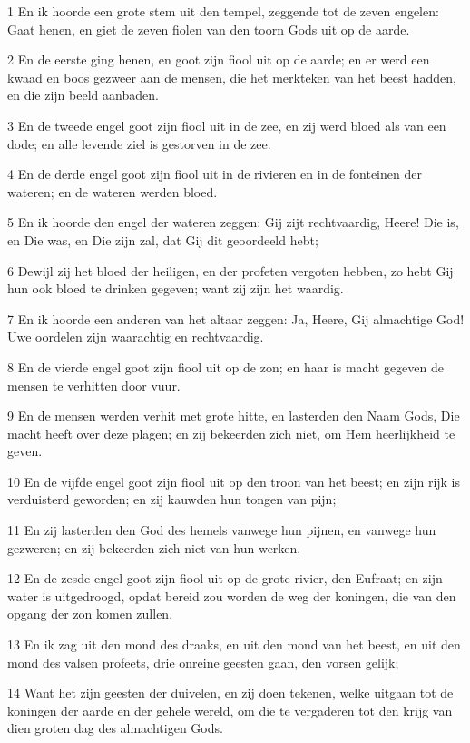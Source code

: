 \par 1 En ik hoorde een grote stem uit den tempel, zeggende tot de zeven engelen: Gaat henen, en giet de zeven fiolen van den toorn Gods uit op de aarde.
\par 2 En de eerste ging henen, en goot zijn fiool uit op de aarde; en er werd een kwaad en boos gezweer aan de mensen, die het merkteken van het beest hadden, en die zijn beeld aanbaden.
\par 3 En de tweede engel goot zijn fiool uit in de zee, en zij werd bloed als van een dode; en alle levende ziel is gestorven in de zee.
\par 4 En de derde engel goot zijn fiool uit in de rivieren en in de fonteinen der wateren; en de wateren werden bloed.
\par 5 En ik hoorde den engel der wateren zeggen: Gij zijt rechtvaardig, Heere! Die is, en Die was, en Die zijn zal, dat Gij dit geoordeeld hebt;
\par 6 Dewijl zij het bloed der heiligen, en der profeten vergoten hebben, zo hebt Gij hun ook bloed te drinken gegeven; want zij zijn het waardig.
\par 7 En ik hoorde een anderen van het altaar zeggen: Ja, Heere, Gij almachtige God! Uwe oordelen zijn waarachtig en rechtvaardig.
\par 8 En de vierde engel goot zijn fiool uit op de zon; en haar is macht gegeven de mensen te verhitten door vuur.
\par 9 En de mensen werden verhit met grote hitte, en lasterden den Naam Gods, Die macht heeft over deze plagen; en zij bekeerden zich niet, om Hem heerlijkheid te geven.
\par 10 En de vijfde engel goot zijn fiool uit op den troon van het beest; en zijn rijk is verduisterd geworden; en zij kauwden hun tongen van pijn;
\par 11 En zij lasterden den God des hemels vanwege hun pijnen, en vanwege hun gezweren; en zij bekeerden zich niet van hun werken.
\par 12 En de zesde engel goot zijn fiool uit op de grote rivier, den Eufraat; en zijn water is uitgedroogd, opdat bereid zou worden de weg der koningen, die van den opgang der zon komen zullen.
\par 13 En ik zag uit den mond des draaks, en uit den mond van het beest, en uit den mond des valsen profeets, drie onreine geesten gaan, den vorsen gelijk;
\par 14 Want het zijn geesten der duivelen, en zij doen tekenen, welke uitgaan tot de koningen der aarde en der gehele wereld, om die te vergaderen tot den krijg van dien groten dag des almachtigen Gods.
